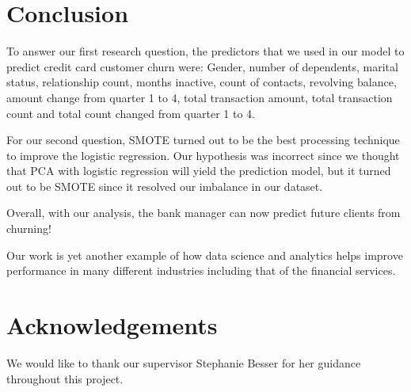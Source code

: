 \hypertarget{conclusion}{%
\section{Conclusion}\label{conclusion}}

To answer our first research question, the predictors that we used in
our model to predict credit card customer churn were: Gender, number of
dependents, marital status, relationship count, months inactive, count
of contacts, revolving balance, amount change from quarter 1 to 4, total
transaction amount, total transaction count and total count changed from
quarter 1 to 4.

For our second question, SMOTE turned out to be the best processing
technique to improve the logistic regression. Our hypothesis was
incorrect since we thought that PCA with logistic regression will yield
the prediction model, but it turned out to be SMOTE since it resolved
our imbalance in our dataset.

Overall, with our analysis, the bank manager can now predict future
clients from churning!

Our work is yet another example of how data science and analytics helps
improve performance in many different industries including that of the
financial services.

\hypertarget{acknowledgements}{%
\section{Acknowledgements}\label{acknowledgements}}

We would like to thank our supervisor Stephanie Besser for her guidance
throughout this project.



\address{%
Hieu Phi Nguyen\\
College of Computing and Digital Media, DePaul University\\%
243 South Wabash Avenue, Chicago, IL 60604\\
%
%
%
\href{mailto:pnguye40@depaul.edu}{\nolinkurl{pnguye40@depaul.edu}}%
}

\address{%
John Vishwas Nelson\\
College of Computing and Digital Media, DePaul University\\%
243 South Wabash Avenue, Chicago, IL 60604\\
%
%
%
\href{mailto:pnguye40@depaul.edu}{\nolinkurl{pnguye40@depaul.edu}}%
}

